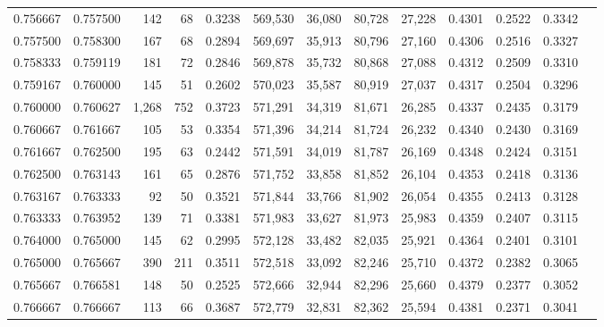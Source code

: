 \begin{tabular}{rrrrrrrrrrrrr}
0.756667 & 0.757500 &   142 &  68 &                                     0.3238 & 569,530 &  36,080 &  80,728 &  27,228 & 0.4301 & 0.2522 & 0.3342 \\
0.757500 & 0.758300 &   167 &  68 &                                     0.2894 & 569,697 &  35,913 &  80,796 &  27,160 & 0.4306 & 0.2516 & 0.3327 \\
0.758333 & 0.759119 &   181 &  72 &                                     0.2846 & 569,878 &  35,732 &  80,868 &  27,088 & 0.4312 & 0.2509 & 0.3310 \\
0.759167 & 0.760000 &   145 &  51 &                                     0.2602 & 570,023 &  35,587 &  80,919 &  27,037 & 0.4317 & 0.2504 & 0.3296 \\
0.760000 & 0.760627 & 1,268 & 752 &                                     0.3723 & 571,291 &  34,319 &  81,671 &  26,285 & 0.4337 & 0.2435 & 0.3179 \\
0.760667 & 0.761667 &   105 &  53 &                                     0.3354 & 571,396 &  34,214 &  81,724 &  26,232 & 0.4340 & 0.2430 & 0.3169 \\
0.761667 & 0.762500 &   195 &  63 &                                     0.2442 & 571,591 &  34,019 &  81,787 &  26,169 & 0.4348 & 0.2424 & 0.3151 \\
0.762500 & 0.763143 &   161 &  65 &                                     0.2876 & 571,752 &  33,858 &  81,852 &  26,104 & 0.4353 & 0.2418 & 0.3136 \\
0.763167 & 0.763333 &    92 &  50 &                                     0.3521 & 571,844 &  33,766 &  81,902 &  26,054 & 0.4355 & 0.2413 & 0.3128 \\
0.763333 & 0.763952 &   139 &  71 &                                     0.3381 & 571,983 &  33,627 &  81,973 &  25,983 & 0.4359 & 0.2407 & 0.3115 \\
0.764000 & 0.765000 &   145 &  62 &                                     0.2995 & 572,128 &  33,482 &  82,035 &  25,921 & 0.4364 & 0.2401 & 0.3101 \\
0.765000 & 0.765667 &   390 & 211 &                                     0.3511 & 572,518 &  33,092 &  82,246 &  25,710 & 0.4372 & 0.2382 & 0.3065 \\
0.765667 & 0.766581 &   148 &  50 &                                     0.2525 & 572,666 &  32,944 &  82,296 &  25,660 & 0.4379 & 0.2377 & 0.3052 \\
0.766667 & 0.766667 &   113 &  66 &                                     0.3687 & 572,779 &  32,831 &  82,362 &  25,594 & 0.4381 & 0.2371 & 0.3041 \\

\end{tabular}
